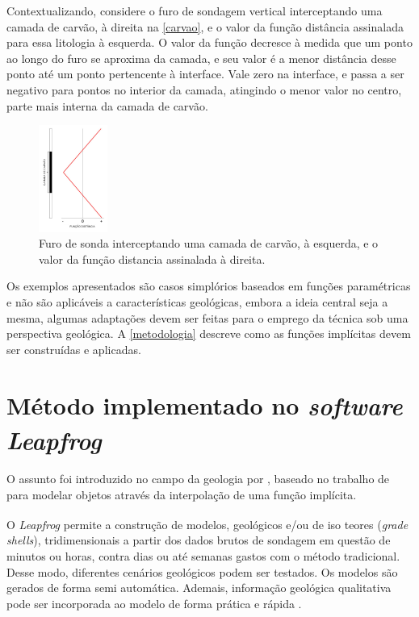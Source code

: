 Contextualizando, considere o furo de sondagem vertical interceptando uma camada de carvão, à direita na \autoref{carvao}, e o valor da função distância assinalada para essa litologia à esquerda. O valor da função decresce à medida que um ponto ao longo do furo se aproxima da camada, e seu valor é a menor distância desse ponto até um ponto pertencente à interface. Vale zero na interface, e passa a ser negativo para pontos no interior da camada, atingindo o menor valor no centro, parte mais interna da camada de carvão.

\begin{figure}[!htb]
	\caption{\label{carvao}Furo de sonda interceptando uma camada de carvão, à esquerda, e o valor da função distancia assinalada à direita.}
	\begin{center}
		\includegraphics[width=0.2\textwidth]{revisao_bibliografica/carvao}
	\end{center}
\end{figure}

Os exemplos apresentados são casos simplórios baseados em funções paramétricas e não são aplicáveis a características geológicas, embora a ideia central seja a mesma, algumas adaptações devem ser feitas para o emprego da técnica sob uma perspectiva geológica. A \autoref{metodologia} descreve como as funções implícitas devem ser construídas e aplicadas.

\section{Método implementado no \textit{software} \textit{Leapfrog}\textsuperscript{\textregistered}}\label{sec_leapfrog}

O assunto foi introduzido no campo da geologia por , baseado no trabalho de  para modelar objetos através da interpolação de uma função implícita. 

O \textit{Leapfrog}\textsuperscript{\textregistered} permite a construção de modelos, geológicos e/ou de iso teores (\textit{grade shells}), tridimensionais a partir dos dados brutos de sondagem em questão de minutos ou horas, contra dias ou até semanas gastos com o método tradicional. Desse modo, diferentes cenários geológicos podem ser testados. Os modelos são gerados de forma semi automática. Ademais, informação geológica qualitativa pode ser incorporada ao modelo de forma prática e rápida \cite{cowan2002rapid}.
 
